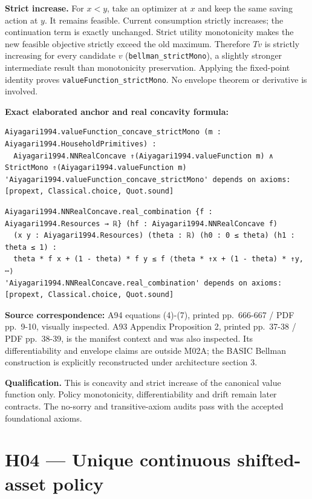 \documentclass[
  11pt,
]{article}
\let\LedgerOriginalTexttt\texttt
\renewcommand{\texttt}[1]{{\small\LedgerOriginalTexttt{#1}}}
\begin{document}
\textbf{Strict increase.} For \(x<y\), take an optimizer at \(x\) and
keep the same saving action at \(y\). It remains feasible. Current
consumption strictly increases; the continuation term is exactly
unchanged. Strict utility monotonicity makes the new feasible objective
strictly exceed the old maximum. Therefore \(T v\) is strictly
increasing for every candidate \(v\) (\texttt{bellman\_strictMono}), a
slightly stronger intermediate result than monotonicity preservation.
Applying the fixed-point identity proves
\texttt{valueFunction\_strictMono}. No envelope theorem or derivative is
involved.

\textbf{Exact elaborated anchor and real concavity formula:}

\begin{verbatim}
Aiyagari1994.valueFunction_concave_strictMono (m : Aiyagari1994.HouseholdPrimitives) :
  Aiyagari1994.NNRealConcave ⇑(Aiyagari1994.valueFunction m) ∧ StrictMono ⇑(Aiyagari1994.valueFunction m)
'Aiyagari1994.valueFunction_concave_strictMono' depends on axioms: [propext, Classical.choice, Quot.sound]
\end{verbatim}

\begin{verbatim}
Aiyagari1994.NNRealConcave.real_combination {f : Aiyagari1994.Resources → ℝ} (hf : Aiyagari1994.NNRealConcave f)
  (x y : Aiyagari1994.Resources) (theta : ℝ) (h0 : 0 ≤ theta) (h1 : theta ≤ 1) :
  theta * f x + (1 - theta) * f y ≤ f ⟨theta * ↑x + (1 - theta) * ↑y, ⋯⟩
'Aiyagari1994.NNRealConcave.real_combination' depends on axioms: [propext, Classical.choice, Quot.sound]
\end{verbatim}

\textbf{Source correspondence:} A94 equations (4)-(7), printed
pp.~666-667 / PDF pp.~9-10, visually inspected. A93 Appendix Proposition
2, printed pp.~37-38 / PDF pp.~38-39, is the manifest context and was
also inspected. Its differentiability and envelope claims are outside
M02A; the BASIC Bellman construction is explicitly reconstructed under
architecture section 3.

\textbf{Qualification.} This is concavity and strict increase of the
canonical value function only. Policy monotonicity, differentiability
and drift remain later contracts. The no-sorry and transitive-axiom
audits pass with the accepted foundational axioms.

\section{H04 --- Unique continuous shifted-asset
policy}\label{h04-unique-continuous-shifted-asset-policy}
\end{document}
